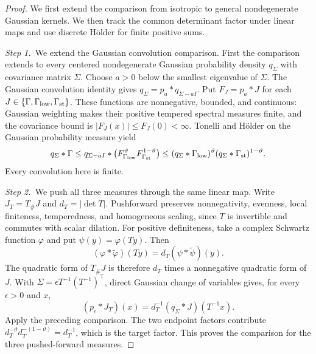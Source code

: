 \documentclass[12pt,oneside,openany]{book}
\numberwithin{equation}{section}
\theoremstyle{nogostyle}
\theoremstyle{definition}
\begin{document}
\begin{proof}
  We first extend the comparison from isotropic to general nondegenerate
  Gaussian kernels. We then track the common determinant factor under linear
  maps and use discrete Hölder for finite positive sums.


  \medskip
  \noindent\textit{Step 1.~}We extend the Gaussian convolution comparison.
  First the comparison extends to every centered nondegenerate Gaussian
  probability density $q_\Sigma$ with covariance matrix $\Sigma$. Choose $a > 0$
  below the smallest eigenvalue of $\Sigma$. The Gaussian convolution identity
  gives $q_\Sigma = p_a*q_{\Sigma-aI}$. Put $F_J = p_a*J$ for each $J \in
  \{\Gamma,\Gamma_{\rm low},\Gamma_{\rm st}\}$. These functions are nonnegative,
  bounded, and continuous: Gaussian weighting makes their positive tempered
  spectral measures finite, and the covariance bound is $|F_J(x)| \le F_J(0) <
  \infty$. Tonelli and H\"older on the Gaussian probability measure yield
  \[
    q_\Sigma*\Gamma
    \le q_{\Sigma-aI}*
    \left(F_{\Gamma_{\rm low}}^\vartheta
    F_{\Gamma_{\rm st}}^{1-\vartheta}\right)
    \le(q_\Sigma*\Gamma_{\rm low})^\vartheta
    (q_\Sigma*\Gamma_{\rm st})^{1-\vartheta}.
  \]
  Every convolution here is finite.


  \medskip
  \noindent\textit{Step 2.~}We push all three measures through the same linear
  map.
  Write $J_T = T_\#J$ and $d_T = |\det T|$. Pushforward preserves nonnegativity,
  evenness, local finiteness, temperedness, and homogeneous scaling, since $T$
  is invertible and commutes with scalar dilation. For positive definiteness,
  take a complex Schwartz function $\varphi$ and put $\psi(y) = \varphi(Ty)$.
  Then
  \[
    (\varphi*\widetilde{\varphi})(Ty)
    =d_T(\psi*\widetilde{\psi})(y).
  \]
  The quadratic form of $T_\#J$ is therefore $d_T$ times a nonnegative quadratic
  form of $J$. With $\Sigma = \epsilon T^{-1}(T^{-1})^\top$, direct Gaussian
  change of variables gives, for every $\epsilon > 0$ and $x$,
  \[
    (p_\epsilon*J_T)(x)
    =d_T^{-1}(q_\Sigma*J)(T^{-1}x).
  \]
  Apply the preceding comparison. The two endpoint factors contribute
  $d_T^{-\vartheta}d_T^{-(1-\vartheta)} = d_T^{-1}$, which is the target factor.
  This proves the comparison for the three pushed-forward measures.



\end{proof}
\end{document}
